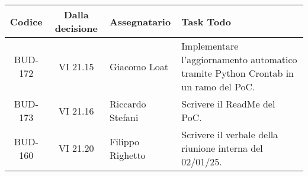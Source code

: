 \clearpage
\vspace*{-2cm} 
\begin{table}[t]
    \centering
    \begin{tabular}{|c|c|p{}|p{}|}
        \hline
        \rowcolor[gray]{0.75}
        \textbf{Codice} & \textbf{Dalla decisione} & \textbf{Assegnatario} & \textbf{Task Todo} \\
        \hline
        BUD-172 & VI 21.15 & Giacomo Loat& Implementare l'aggiornamento automatico tramite Python Crontab in un ramo del PoC. \\
        \hline
        BUD-173 & VI 21.16 & Riccardo Stefani & Scrivere il ReadMe del PoC. \\
        \hline
        BUD-160 & VI 21.20 & Filippo Righetto & Scrivere il verbale della riunione interna del 02/01/25. \\
        \hline
    \end{tabular}
\end{table}
